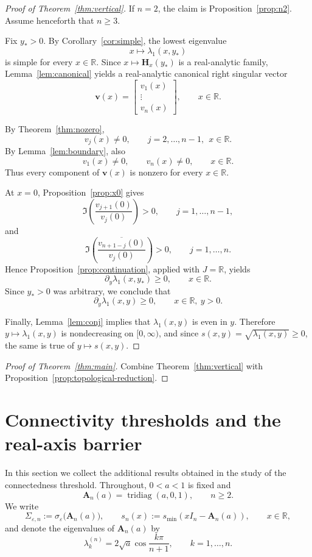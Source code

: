 \documentclass[11pt]{article}
\numberwithin{equation}{section}
\begin{document}
\begin{proof}[Proof of Theorem~\ref{thm:vertical}]
If $n=2$, the claim is Proposition~\ref{prop:n2}.  Assume henceforth that
$n\ge3$.

Fix $y_*>0$.  By Corollary~\ref{cor:simple}, the lowest eigenvalue
\[
x\longmapsto \lambda_1(x,y_*)
\]
is simple for every $x\in\mathbb{R}$.  Since $x\mapsto \mathbf H_x(y_*)$ is a
real-analytic family, Lemma~\ref{lem:canonical} yields a real-analytic
canonical right singular vector
\[
\bm v(x)=
\begin{bmatrix}
v_1(x)\\
\vdots\\
v_n(x)
\end{bmatrix},
\qquad
x\in\mathbb{R}.
\]

By Theorem~\ref{thm:nozero},
\[
v_j(x)\neq0,
\qquad
j=2,\dots,n-1,\ \ x\in\mathbb{R}.
\]
By Lemma~\ref{lem:boundary}, also
\[
v_1(x)\neq0,
\qquad
v_n(x)\neq0,
\qquad
x\in\mathbb{R}.
\]
Thus every component of $\bm v(x)$ is nonzero for every $x\in\mathbb{R}$.

At $x=0$, Proposition~\ref{prop:x0} gives
\[
\Im\!\left(\frac{v_{j+1}(0)}{v_j(0)}\right)>0,
\qquad
j=1,\dots,n-1,
\]
and
\[
\Im\!\left(\frac{\overline{v_{n+1-j}(0)}}{v_j(0)}\right)>0,
\qquad
j=1,\dots,n.
\]
Hence Proposition~\ref{prop:continuation}, applied with $J=\mathbb{R}$, yields
\[
\partial_y\lambda_1(x,y_*)\ge0,
\qquad
x\in\mathbb{R}.
\]
Since $y_*>0$ was arbitrary, we conclude that
\[
\partial_y\lambda_1(x,y)\ge0,
\qquad
x\in\mathbb{R},\ y>0.
\]

Finally, Lemma~\ref{lem:conj} implies that $\lambda_1(x,y)$ is even in $y$.
Therefore $y\mapsto \lambda_1(x,y)$ is nondecreasing on $[0,\infty)$, and
since $s(x,y)=\sqrt{\lambda_1(x,y)}\ge0$, the same is true of $y\mapsto s(x,y)$.
\end{proof}

\begin{proof}[Proof of Theorem~\ref{thm:main}]
Combine Theorem~\ref{thm:vertical} with
Proposition~\ref{prop:topological-reduction}.
\end{proof}

\section{Connectivity thresholds and the real-axis barrier}\label{sec:thresholds}

In this section we collect the additional results obtained in the study of the
connectedness threshold.  Throughout, \(0<a<1\) is fixed and
\[
\mathbf A_n(a)=\operatorname{tridiag}(a,0,1),\qquad n\ge2.
\]
We write
\[
\Sigma_{\varepsilon,n}:=\sigma_\varepsilon\bigl(\mathbf A_n(a)\bigr),
\qquad
s_n(x):=s_{\min}(xI_n-\mathbf A_n(a)),\qquad x\in\mathbb R,
\]
and denote the eigenvalues of \(\mathbf A_n(a)\) by
\[
\lambda_k^{(n)}=2\sqrt a\cos\frac{k\pi}{n+1},\qquad k=1,\dots,n.
\]
\end{document}
